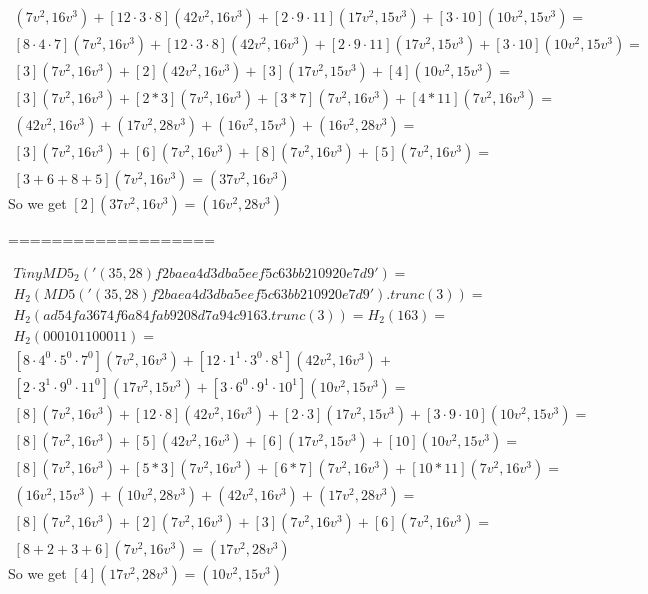 \begin{example}
\begin{align*}
[8\cdot 4\cdot 7](7v^2 , 16v^3)+
[12\cdot 3\cdot 8](42v^2 , 16v^3 )+
[2\cdot 9\cdot 11](17v^2 , 15v^3 ) +
[3\cdot 10](10v^2 , 15v^3 ) =\\
[8\cdot 4\cdot 7](7v^2 , 16v^3)+
[12\cdot 3\cdot 8](42v^2 , 16v^3 )+
[2\cdot 9\cdot 11](17v^2 , 15v^3 ) +
[3\cdot 10](10v^2 , 15v^3 ) =\\
[3](7v^2 , 16v^3)+
[2](42v^2 , 16v^3 )+
[3](17v^2 , 15v^3 ) +
[4](10v^2 , 15v^3 )=\\
[3](7v^2 , 16v^3)+
[2*3](7v^2 , 16v^3 )+
[3*7](7v^2 , 16v^3 ) +
[4*11](7v^2 , 16v^3 )=\\
(42v^2 , 16v^3)+
(17v^2 , 28v^3 )+
(16v^2 , 15v^3 ) +
(16v^2 , 28v^3 )=\\
[3](7v^2 , 16v^3)+
[6](7v^2 , 16v^3 )+
[8](7v^2 , 16v^3 ) +
[5](7v^2 , 16v^3 )=\\
[3+6+8+5](7v^2 , 16v^3)=
(37v^2 , 16v^3 )
\end{align*}
So we get $[2](37v^2 , 16v^3 )= (16v^2 , 28v^3 )$

===================

\begin{align*}
TinyMD5_{2}('(35,28)f2baea4d3dba5eef5c63bb210920e7d9') =\\ H_2(MD5('(35,28)f2baea4d3dba5eef5c63bb210920e7d9').trunc(3))=\\ H_2(ad54fa3674f6a84fab9208d7a94c9163.trunc(3))= H_2(163) = \\
H_2(000 101 100 011)=\\
[8\cdot 4^{0}\cdot 5^{0}\cdot 7^{0}](7v^2 , 16v^3)+
[12\cdot 1^{1}\cdot 3^{0}\cdot 8^{1}](42v^2 , 16v^3 )+\\
[2\cdot 3^{1}\cdot 9^{0}\cdot 11^{0}](17v^2 , 15v^3 ) +
[3\cdot 6^{0}\cdot 9^{1}\cdot 10^{1}](10v^2 , 15v^3 ) = \\
[8](7v^2 , 16v^3)+
[12\cdot 8](42v^2 , 16v^3 )+
[2\cdot 3](17v^2 , 15v^3 ) +
[3\cdot 9\cdot 10](10v^2 , 15v^3 ) = \\
[8](7v^2 , 16v^3)+
[5](42v^2 , 16v^3 )+
[6](17v^2 , 15v^3 ) +
[10](10v^2 , 15v^3 ) = \\
[8](7v^2 , 16v^3)+
[5*3](7v^2 , 16v^3 )+
[6*7](7v^2 , 16v^3 ) +
[10*11](7v^2 , 16v^3 )=\\
(16v^2 , 15v^3)+
(10v^2 , 28v^3 )+
(42v^2 , 16v^3 ) +
(17v^2 , 28v^3 )=\\
[8](7v^2 , 16v^3)+
[2](7v^2 , 16v^3 )+
[3](7v^2 , 16v^3 ) +
[6](7v^2 , 16v^3 )=\\
[8+2+3+6](7v^2 , 16v^3)=
(17v^2 , 28v^3 )
\end{align*}
So we get $[4](17v^2 , 28v^3 )= (10v^2 , 15v^3 )$


\end{example}
